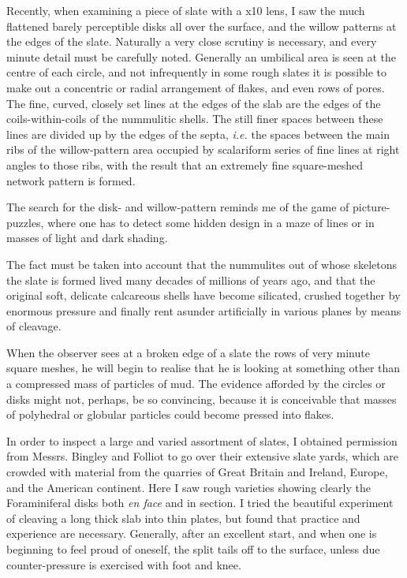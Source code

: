 \documentclass[a4paper, 12pt, oneside]{article}
\begin{document}
Recently, when examining a piece of slate with a x10 lens, I saw the much flattened barely perceptible disks all over the surface, and the willow patterns at the edges of the slate. Naturally a very close scrutiny is necessary, and every minute detail must be carefully noted. Generally an umbilical area is seen at the centre of each circle, and not infrequently in some rough slates it is possible to make out a concentric or radial arrangement of flakes, and even rows of pores. The fine, curved, closely set lines at the edges of the slab are the edges of the coils-within-coils of the nummulitic shells. The still finer spaces between these lines are divided up by the edges of the septa, \emph{i.e.} the spaces between the main ribs of the willow-pattern area occupied by scalariform series of fine lines at right angles to those ribs, with the result that an extremely fine square-meshed network pattern is formed.

The search for the disk- and willow-pattern reminds me of the game of picture-puzzles, where one has to detect some hidden design in a maze of lines or in masses of light and dark shading.

The fact must be taken into account that the nummulites out of whose skeletons the slate is formed lived many decades of millions of years ago, and that the original soft, delicate calcareous shells have become silicated, crushed together by enormous pressure and finally rent asunder artificially in various planes by means of cleavage.

When the observer sees at a broken edge of a slate the rows of very minute square meshes, he will begin to realise that he is looking at something other than a compressed mass of particles of mud. The evidence afforded by the circles or disks might not, perhaps, be so convincing, because it is conceivable that masses of polyhedral or globular particles could become pressed into flakes.

In order to inspect a large and varied assortment of slates, I obtained permission from Messrs. Bingley and Folliot to go over their extensive slate yards, which are crowded with material from the quarries of Great Britain and Ireland, Europe, and the American continent. Here I saw rough varieties showing clearly the Foraminiferal disks both \emph{en face} and in section. I tried the beautiful experiment of cleaving a long thick slab into thin plates, but found that practice and experience are necessary. Generally, after an excellent start, and when one is beginning to feel proud of oneself, the split tails off to the surface, unless due counter-pressure is exercised with foot and knee.
\end{document}
